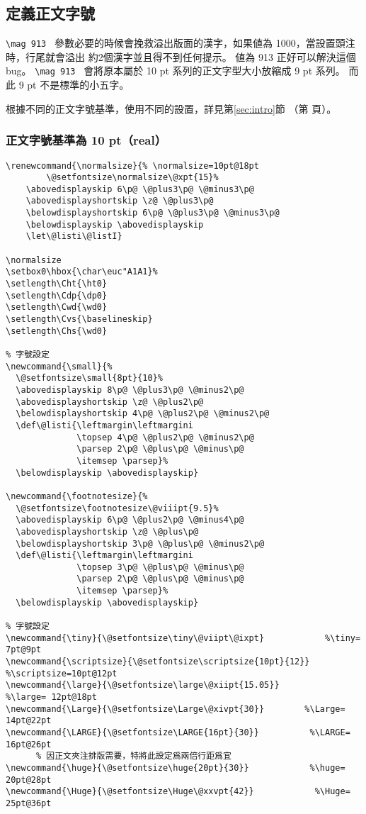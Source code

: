 \subsection{定義正文字號}

\par \verb+\mag 913 + 
參數必要的時候會挽救溢出版面的漢字，如果値為 1000，當設置頭注時，行尾就會溢出
約2個漢字並且得不到任何提示。 値為 913 正好可以解決這個 bug。 
\verb+\mag 913 + 會將原本屬於 10 pt 系列的正文字型大小放縮成 9 pt 系列。 
而此 9 pt 不是標準的小五字。

\par 根據不同的正文字號基準，使用不同的設置，詳見第\ref{sec:intro}節
（第\pageref{sec:intro} 頁）。

\subsubsection{正文字號基準為 10 pt（real）}
\begin{lstlisting}[firstnumber=120]
%% 定義正文字號
\renewcommand{\normalsize}{% \normalsize=10pt@18pt
        \@setfontsize\normalsize\@xpt{15}%
    \abovedisplayskip 6\p@ \@plus3\p@ \@minus3\p@
    \abovedisplayshortskip \z@ \@plus3\p@
    \belowdisplayshortskip 6\p@ \@plus3\p@ \@minus3\p@
    \belowdisplayskip \abovedisplayskip
    \let\@listi\@listI}

\normalsize
\setbox0\hbox{\char\euc"A1A1}%
\setlength\Cht{\ht0}
\setlength\Cdp{\dp0}
\setlength\Cwd{\wd0}
\setlength\Cvs{\baselineskip}
\setlength\Chs{\wd0}

% 字號設定
\newcommand{\small}{%
  \@setfontsize\small{8pt}{10}%
  \abovedisplayskip 8\p@ \@plus3\p@ \@minus2\p@
  \abovedisplayshortskip \z@ \@plus2\p@
  \belowdisplayshortskip 4\p@ \@plus2\p@ \@minus2\p@
  \def\@listi{\leftmargin\leftmargini
              \topsep 4\p@ \@plus2\p@ \@minus2\p@
              \parsep 2\p@ \@plus\p@ \@minus\p@
              \itemsep \parsep}%
  \belowdisplayskip \abovedisplayskip}

\newcommand{\footnotesize}{%
  \@setfontsize\footnotesize\@viiipt{9.5}%
  \abovedisplayskip 6\p@ \@plus2\p@ \@minus4\p@
  \abovedisplayshortskip \z@ \@plus\p@
  \belowdisplayshortskip 3\p@ \@plus\p@ \@minus2\p@
  \def\@listi{\leftmargin\leftmargini
              \topsep 3\p@ \@plus\p@ \@minus\p@
              \parsep 2\p@ \@plus\p@ \@minus\p@
              \itemsep \parsep}%
  \belowdisplayskip \abovedisplayskip}

% 字號設定
\newcommand{\tiny}{\@setfontsize\tiny\@viipt\@ixpt}            %\tiny= 7pt@9pt
\newcommand{\scriptsize}{\@setfontsize\scriptsize{10pt}{12}}    %\scriptsize=10pt@12pt
\newcommand{\large}{\@setfontsize\large\@xiipt{15.05}}         %\large= 12pt@18pt
\newcommand{\Large}{\@setfontsize\Large\@xivpt{30}}        %\Large= 14pt@22pt
\newcommand{\LARGE}{\@setfontsize\LARGE{16pt}{30}}          %\LARGE= 16pt@26pt
      % 因正文夾注排版需要，特將此設定爲兩倍行距爲宜
\newcommand{\huge}{\@setfontsize\huge{20pt}{30}}            %\huge= 20pt@28pt
\newcommand{\Huge}{\@setfontsize\Huge\@xxvpt{42}}            %\Huge= 25pt@36pt
\end{lstlisting}


